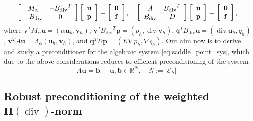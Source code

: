 \documentclass[11pt]{amsart}
\numberwithin{equation}{section}
\theoremstyle{definition}\newtheorem{example}{Example}[section]
\begin{document}
\begin{equation}\label{eq:saddle_point_sys}
 \left[
\begin{array}{cc}
{{M}_{{\alpha}}} & -{B_{\operatorname{div}}}^T \\
-{B_{\operatorname{div}}} & 0
\end{array}
\right]
\left[
\begin{array}{c}
 {\bf u} \\
 {\bf p}
\end{array}
\right]=
\left[
\begin{array}{c}
 \bf{0} \\
 \bf{f}
\end{array}
\right], 
\quad
\left[
\begin{array}{cc}
 A & {B_{\operatorname{div}}}^T \\
{B_{\operatorname{div}}} & D
\end{array}
\right]
\left[
\begin{array}{c}
 {\bf u} \\
 {\bf p}
\end{array}
\right]=
\left[
\begin{array}{c}
 \bf{0} \\
 \bf{f}
\end{array}
\right], 
\end{equation}
where 
$
{{\mathbf v}}^T {{M}_{{\alpha}}} {{\mathbf u}} =(\alpha {{\mathbf u}}_h, {{\mathbf v}}_h)$,
${{\mathbf v}}^T {B_{\operatorname{div}}}^T {\bm p}=(p_h, {\operatorname{div}} {{\mathbf v}}_h)$,
${\bm q}^T {B_{\operatorname{div}}} {{\mathbf u}}=({\operatorname{div}} {{\mathbf u}}_h, q_h)$,
$ {{\mathbf v}}^T A{{\mathbf u}} = \Lambda_{{\alpha}}({{\mathbf u}}_h,{{\mathbf v}}_h)$, 
and $  {\bm q}^T D {\bm p}=(K \nabla p_h, \nabla q_h).
$
Our aim now is to derive and study a preconditioner for the algebraic system 
 \eqref{eq:saddle_point_sys}, which due to the above considerations reduces 
to efficient preconditioning of 
the system
\begin{equation}\label{algebraic-hdiv}
A {{\mathbf u}} = {{\mathbf b}}, \quad {{\mathbf u}}, {{\mathbf b}} \in  \mathbb{R}^N, \quad N:={|\mathcal{E}_h|}.
\end{equation}

\subsection{Robust preconditioning of the weighted ${{\boldsymbol H}}({\operatorname{div}})$-norm}\label{sec:robust-H_div-precond}
\end{document}
